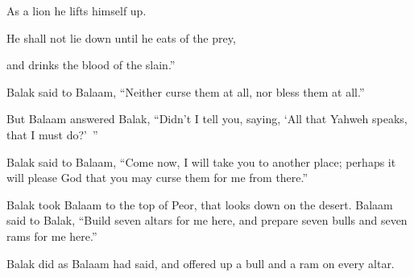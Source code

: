 {\par }{\QB As a lion he lifts himself up.
\par }{\Q He shall not lie down until he eats of the prey,
\par }{\QB and drinks the blood of the slain.”
\par }{\PP {}Balak said to Balaam, “Neither curse them at all, nor bless them at all.”
\par }{\PP {}But Balaam answered Balak, “Didn’t I tell you, saying, ‘All that Yahweh speaks, that I must do?’ ”
\par }{\PP {}Balak said to Balaam, “Come now, I will take you to another place; perhaps it will please God that you may curse them for me from there.”
\par }{\PP {}Balak took Balaam to the top of Peor, that looks down on the desert.
Balaam said to Balak, “Build seven altars for me here, and prepare seven bulls and seven rams for me here.”
\par }{\PP {}Balak did as Balaam had said, and offered up a bull and a ram on every altar.

}
